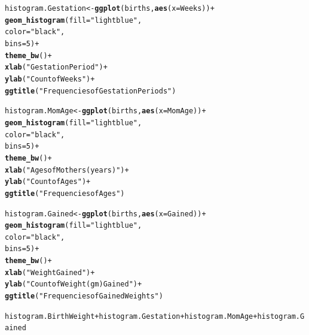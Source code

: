\documentclass{article}\usepackage[]{graphicx}\usepackage[]{xcolor}
\makeatletter
\newcommand{\hlnum}[1]{\textcolor[rgb]{0.686,0.059,0.569}{#1}}%
\newcommand{\hlstr}[1]{\textcolor[rgb]{0.192,0.494,0.8}{#1}}%
\newcommand{\hlopt}[1]{\textcolor[rgb]{0,0,0}{#1}}%
\newcommand{\hlstd}[1]{\textcolor[rgb]{0.345,0.345,0.345}{#1}}%
\newcommand{\hlkwb}[1]{\textcolor[rgb]{0.69,0.353,0.396}{#1}}%
\newcommand{\hlkwc}[1]{\textcolor[rgb]{0.333,0.667,0.333}{#1}}%
\newcommand{\hlkwd}[1]{\textcolor[rgb]{0.737,0.353,0.396}{\textbf{#1}}}%
\newenvironment{kframe}{%
 \def\at@end@of@kframe{}%
 \ifinner\ifhmode%
  \def\at@end@of@kframe{\end{minipage}}%
  \begin{minipage}{\columnwidth}%
 \fi\fi%
 \def\FrameCommand##1{\hskip\@totalleftmargin \hskip-\fboxsep
 \colorbox{shadecolor}{##1}\hskip-\fboxsep
     \hskip-\linewidth \hskip-\@totalleftmargin \hskip\columnwidth}%
 \MakeFramed {\advance\hsize-\width
   \@totalleftmargin\z@ \linewidth\hsize
   \@setminipage}}%
 {\par\unskip\endMakeFramed%
 \at@end@of@kframe}
\newenvironment{knitrout}{}{} %
\makeatother
\begin{document}
\begin{enumerate}[a.]
\begin{knitrout}
\begin{kframe}
\begin{alltt}
\hlstd{histogram.Gestation}\hlkwb{<-} \hlkwd{ggplot}\hlstd{(births,} \hlkwd{aes}\hlstd{(}\hlkwc{x}\hlstd{=Weeks))}\hlopt{+}
  \hlkwd{geom_histogram}\hlstd{(}\hlkwc{fill} \hlstd{=} \hlstr{"lightblue"}\hlstd{,}
                 \hlkwc{color} \hlstd{=} \hlstr{"black"}\hlstd{,}
                 \hlkwc{bins} \hlstd{=} \hlnum{5}\hlstd{)} \hlopt{+}
  \hlkwd{theme_bw}\hlstd{()} \hlopt{+}
  \hlkwd{xlab}\hlstd{(}\hlstr{"Gestation Period"}\hlstd{)}\hlopt{+}
  \hlkwd{ylab}\hlstd{(}\hlstr{"Count of Weeks"}\hlstd{)}\hlopt{+}
  \hlkwd{ggtitle}\hlstd{(}\hlstr{"Frequencies of Gestation Periods"}\hlstd{)}

\hlstd{histogram.MomAge} \hlkwb{<-} \hlkwd{ggplot}\hlstd{(births,} \hlkwd{aes}\hlstd{(}\hlkwc{x}\hlstd{=MomAge))}\hlopt{+}
  \hlkwd{geom_histogram}\hlstd{(}\hlkwc{fill} \hlstd{=} \hlstr{"lightblue"}\hlstd{,}
                 \hlkwc{color} \hlstd{=} \hlstr{"black"}\hlstd{,}
                 \hlkwc{bins} \hlstd{=} \hlnum{5}\hlstd{)} \hlopt{+}
  \hlkwd{theme_bw}\hlstd{()} \hlopt{+}
  \hlkwd{xlab}\hlstd{(}\hlstr{"Ages of Mothers(years)"}\hlstd{)}\hlopt{+}
  \hlkwd{ylab}\hlstd{(}\hlstr{"Count of Ages"}\hlstd{)}\hlopt{+}
  \hlkwd{ggtitle}\hlstd{(}\hlstr{"Frequencies of Ages"}\hlstd{)}

\hlstd{histogram.Gained}\hlkwb{<-} \hlkwd{ggplot}\hlstd{(births,} \hlkwd{aes}\hlstd{(}\hlkwc{x}\hlstd{=Gained))}\hlopt{+}
  \hlkwd{geom_histogram}\hlstd{(}\hlkwc{fill} \hlstd{=} \hlstr{"lightblue"}\hlstd{,}
                 \hlkwc{color} \hlstd{=} \hlstr{"black"}\hlstd{,}
                 \hlkwc{bins} \hlstd{=} \hlnum{5}\hlstd{)} \hlopt{+}
  \hlkwd{theme_bw}\hlstd{()} \hlopt{+}
  \hlkwd{xlab}\hlstd{(}\hlstr{"Weight Gained"}\hlstd{)}\hlopt{+}
  \hlkwd{ylab}\hlstd{(}\hlstr{"Count of Weight(gm) Gained"}\hlstd{)}\hlopt{+}
  \hlkwd{ggtitle}\hlstd{(}\hlstr{"Frequencies of Gained Weights"}\hlstd{)}

\hlstd{histogram.BirthWeight} \hlopt{+} \hlstd{histogram.Gestation} \hlopt{+} \hlstd{histogram.MomAge} \hlopt{+} \hlstd{histogram.Gained}
\end{alltt}
\end{kframe}
\end{knitrout}


\end{enumerate}
\end{document}
